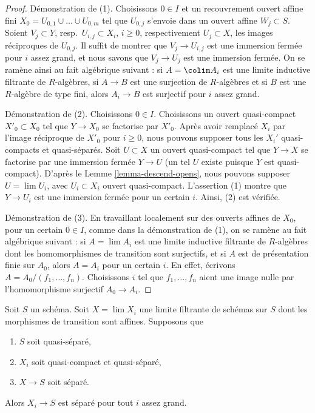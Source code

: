 \begin{proof}
Démonstration de (1). Choisissons $0 \in I$ et un recouvrement ouvert affine
fini $X_0 = U_{0, 1} \cup \ldots \cup U_{0, m}$ tel que $U_{0, j}$ s'envoie
dans un ouvert affine $W_j \subset S$. Soient $V_j \subset Y$,
resp.\ $U_{i, j} \subset X_i$, $i \geq 0$, respectivement
$U_j \subset X$, les images réciproques de $U_{0, j}$. Il suffit de montrer
que $V_j \to U_{i, j}$ est une immersion fermée pour $i$ assez grand, et
nous savons que $V_j \to U_j$ est une immersion fermée. On se ramène ainsi
au fait algébrique suivant : si $A = \colim A_i$ est une limite inductive
filtrante de $R$-algèbres, si $A \to B$ est une surjection de $R$-algèbres
et si $B$ est une $R$-algèbre de type fini, alors $A_i \to B$ est surjectif
pour $i$ assez grand.

\medskip\noindent
Démonstration de (2). Choisissons $0 \in I$. Choisissons un ouvert
quasi-compact $X'_0 \subset X_0$ tel que $Y \to X_0$ se factorise par $X'_0$.
Après avoir remplacé $X_i$ par l'image réciproque de
$X'_0$ pour $i \geq 0$, nous pouvons supposer tous les $X_i'$ quasi-compacts et
quasi-séparés. Soit $U \subset X$ un ouvert quasi-compact tel que
$Y \to X$ se factorise par une immersion fermée $Y \to U$ (un tel $U$
existe puisque $Y$ est quasi-compact). D'après le
Lemme \ref{lemma-descend-opens}, nous pouvons supposer
$U = \lim U_i$, avec $U_i \subset X_i$ ouvert quasi-compact. L'assertion (1)
montre que $Y \to U_i$ est une immersion fermée pour un certain $i$. Ainsi,
(2) est vérifiée.

\medskip\noindent
Démonstration de (3). En travaillant localement sur des ouverts affines de
$X_0$, pour un certain $0 \in I$, comme dans la démonstration de (1), on se
ramène au fait algébrique suivant : si $A = \lim A_i$ est une limite
inductive filtrante de $R$-algèbres dont les homomorphismes de transition
sont surjectifs, et si $A$ est de présentation finie sur $A_0$, alors
$A = A_i$ pour un certain $i$. En effet, écrivons
$A = A_0/(f_1, \ldots, f_n)$. Choisissons $i$ tel que
$f_1, \ldots, f_n$ aient une image nulle par l'homomorphisme surjectif
$A_0 \to A_i$.
\end{proof}

\begin{lemma}
\label{lemma-eventually-separated}
Soit $S$ un schéma. Soit $X = \lim X_i$ une limite filtrante de schémas sur
$S$ dont les morphismes de transition sont affines. Supposons que
\begin{enumerate}
\item $S$ soit quasi-séparé,
\item $X_i$ soit quasi-compact et quasi-séparé,
\item $X \to S$ soit séparé.
\end{enumerate}
Alors $X_i \to S$ est séparé pour tout $i$ assez grand.
\end{lemma}

